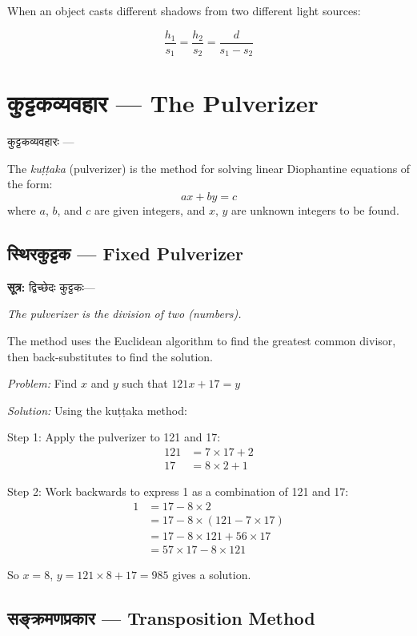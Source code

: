 \documentclass[10pt,a4paper]{article}
\newenvironment{sanskritverse}{%
  \begin{center}%
  \begin{minipage}{0.94\textwidth}%
  \centering\devanagarifont\small%
}{%
  \end{minipage}%
  \end{center}%
  \vspace{0.1em}%
}
\newcommand{\sutratxt}[2]{%
  \begin{center}%
  \colorbox{sanskritbg}{%
    \begin{minipage}{0.93\textwidth}%
    \centering\small\vspace{3pt}%
    {\devanagarifont\textbf{सूत्र:} #1}\par\vspace{2pt}%
    \textit{#2}\vspace{3pt}%
    \end{minipage}%
  }%
  \end{center}%
  \vspace{0.1em}%
}
\begin{document}
When an object casts different shadows from two different light sources:

\[
\frac{h_1}{s_1} = \frac{h_2}{s_2} = \frac{d}{s_1 - s_2}
\]

\section{कुट्टकव्यवहार — The Pulverizer}
\label{sec:kuttaka}

\begin{sanskritverse}
कुट्टकव्यवहारः ---
\end{sanskritverse}

The \textit{kuṭṭaka} (pulverizer) is the method for solving linear Diophantine equations of the form:
\[
ax + by = c
\]
where $a$, $b$, and $c$ are given integers, and $x$, $y$ are unknown integers to be found.

\subsection{स्थिरकुट्टक — Fixed Pulverizer}

\sutratxt{द्विच्छेदः कुट्टकः---}{The pulverizer is the division of two (numbers).}

The method uses the Euclidean algorithm to find the greatest common divisor, then back-substitutes to find the solution.

\textit{Problem:} Find $x$ and $y$ such that $121x + 17 = y$

\textit{Solution:} Using the kuṭṭaka method:

Step 1: Apply the pulverizer to 121 and 17:
\begin{align*}
121 &= 7 \times 17 + 2 \\
17 &= 8 \times 2 + 1
\end{align*}

Step 2: Work backwards to express 1 as a combination of 121 and 17:
\begin{align*}
1 &= 17 - 8 \times 2 \\
&= 17 - 8 \times (121 - 7 \times 17) \\
&= 17 - 8 \times 121 + 56 \times 17 \\
&= 57 \times 17 - 8 \times 121
\end{align*}

So $x = 8$, $y = 121 \times 8 + 17 = 985$ gives a solution.

\subsection{सङ्क्रमणप्रकार — Transposition Method}
\end{document}
